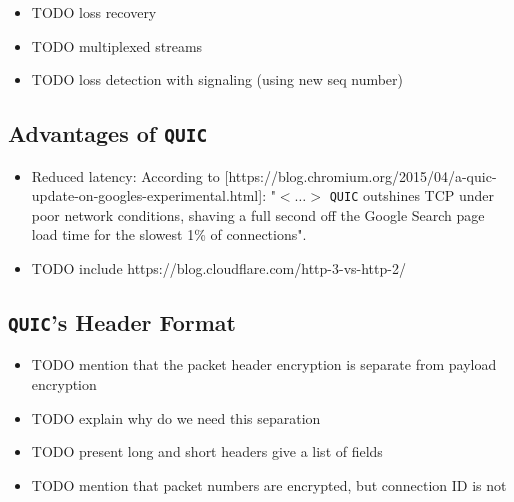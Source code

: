\documentclass[12pt,a4paper,twoside,openright]{report}
\begin{document}
\begin{itemize}
  
  
  
  \item TODO loss recovery

  \item TODO multiplexed streams
 
  \item TODO loss detection with signaling (using new seq number)
  
  
  
  
  
\end{itemize}


\subsection{Advantages of \texttt{QUIC}} \label{QUIC_advantages}

\begin{itemize}
  \item Reduced latency:
  According to [https://blog.chromium.org/2015/04/a-quic-update-on-googles-experimental.html]: "$<\ldots>$ \texttt{QUIC} outshines TCP under poor network conditions, shaving a full second off the Google Search page load time for the slowest 1\% of connections".

  
  \item TODO include https://blog.cloudflare.com/http-3-vs-http-2/
\end{itemize}




\subsection{\texttt{QUIC}'s Header Format} \label{subsection_QUIC_header_format}

\begin{itemize}
  \item TODO mention that the packet header encryption is separate from payload encryption
  \item TODO explain why do we need this separation
  \item TODO present long and short headers give a list of fields
  \item TODO mention that packet numbers are encrypted, but connection ID is not
\end{itemize}
\end{document}
